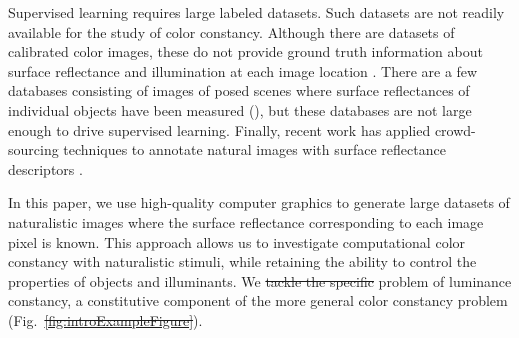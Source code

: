 \documentclass{jov}
\providecommand{\DIFaddtex}[1]{{\protect\color{blue}\uwave{#1}}} %
\providecommand{\DIFdeltex}[1]{{\protect\color{red}\sout{#1}}}                      %
\providecommand{\DIFaddbegin}{} %
\providecommand{\DIFaddend}{} %
\providecommand{\DIFdelbegin}{} %
\providecommand{\DIFdelend}{} %
\providecommand{\DIFadd}[1]{\texorpdfstring{\DIFaddtex{#1}}{#1}} %
\providecommand{\DIFdel}[1]{\texorpdfstring{\DIFdeltex{#1}}{}} %
\newcommand{\DIFscaledelfig}{0.5}
\newlength{\DIFdelgraphicswidth} %
\newlength{\DIFdelgraphicsheight} %
\newcommand{\DIFaddincludegraphics}[2][]{{\color{blue}\fbox{\DIFOincludegraphics[#1]{#2}}}} %
\newcommand{\DIFdelincludegraphics}[2][]{%
\sbox{\DIFdelgraphicsbox}{\DIFOincludegraphics[#1]{#2}}%
\settoboxwidth{\DIFdelgraphicswidth}{\DIFdelgraphicsbox} %
\settoboxtotalheight{\DIFdelgraphicsheight}{\DIFdelgraphicsbox} %
\scalebox{\DIFscaledelfig}{%
\parbox[b]{\DIFdelgraphicswidth}{\usebox{\DIFdelgraphicsbox}\\[-\baselineskip] \rule{\DIFdelgraphicswidth}{0em}}\llap{\resizebox{\DIFdelgraphicswidth}{\DIFdelgraphicsheight}{%
\setlength{\unitlength}{\DIFdelgraphicswidth}%
\begin{picture}(1,1)%
\thicklines\linethickness{2pt} %
{\color[rgb]{1,0,0}\put(0,0){\framebox(1,1){}}}%
{\color[rgb]{1,0,0}\put(0,0){\line( 1,1){1}}}%
{\color[rgb]{1,0,0}\put(0,1){\line(1,-1){1}}}%
\end{picture}%
}\hspace*{3pt}}} %
} %
\DeclareRobustCommand{\DIFaddbegin}{\DIFOaddbegin \let\includegraphics\DIFaddincludegraphics} %
\DeclareRobustCommand{\DIFaddend}{\DIFOaddend \let\includegraphics\DIFOincludegraphics} %
\DeclareRobustCommand{\DIFdelbegin}{\DIFOdelbegin \let\includegraphics\DIFdelincludegraphics} %
\DeclareRobustCommand{\DIFdelend}{\DIFOaddend \let\includegraphics\DIFOincludegraphics} %
\begin{document}
Supervised learning requires large labeled datasets. Such datasets are not readily available for the study of color constancy. Although there are datasets of calibrated color images, these do not provide ground truth information about surface reflectance and illumination at each image location \cite{ChakrabartiHyperspectral,NascimentoFoster2016,ParragaHyperspectralData,TkacikUpennHypersepctralData,skauli2013collection,olmos2004biologically}. There are a few databases consisting of images of posed scenes where surface reflectances of individual objects have been measured (), but these databases are not large enough to drive supervised learning. Finally, recent work has applied crowd-sourcing techniques to annotate natural images with surface reflectance descriptors \cite{bell2014intrinsic}.

In this paper, we use high-quality computer graphics to generate large datasets of naturalistic images where the surface reflectance corresponding to each image pixel is known. 
This approach allows us to investigate computational color constancy with naturalistic stimuli, while retaining the ability to control the properties of objects and illuminants. We \DIFdelbegin \DIFdel{tackle the specific }\DIFdelend \DIFaddbegin \DIFadd{specifically tackle the }\DIFaddend problem of luminance constancy, a constitutive component of the more general color constancy problem (Fig.~\DIFdelbegin \DIFdel{\ref{fig:introExampleFigure}}\DIFdelend \DIFaddbegin \DIFadd{\ref{fig:introFigure}b}\DIFaddend ). 
\end{document}
